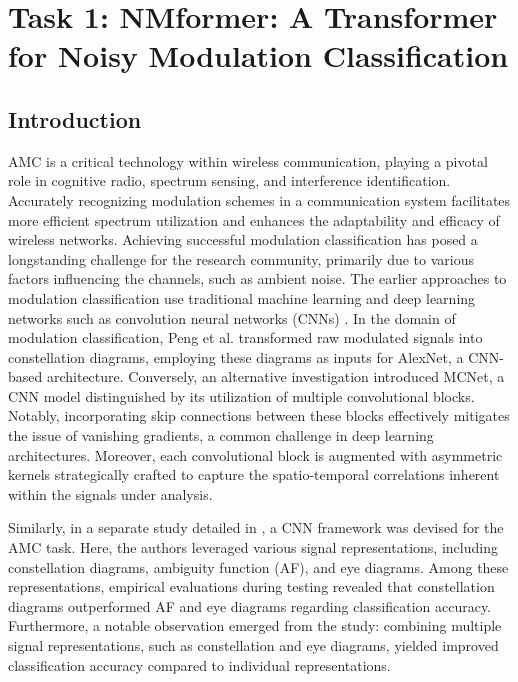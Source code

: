 \section{Task 1: NMformer: A Transformer for Noisy Modulation Classification}

\subsection{Introduction}
AMC is a critical technology within wireless communication, playing a pivotal role in cognitive radio, spectrum sensing, and interference identification. Accurately recognizing modulation schemes in a communication system facilitates more efficient spectrum utilization and enhances the adaptability and efficacy of wireless networks. Achieving successful modulation classification has posed a longstanding challenge for the research community, primarily due to various factors influencing the channels, such as ambient noise. The earlier approaches to modulation classification use traditional machine learning and deep learning networks such as convolution neural networks (CNNs) \cite{peng2017modulation,8963964,10139474}. In the domain of modulation classification, Peng et al. \cite{peng2017modulation} transformed raw modulated signals into constellation diagrams, employing these diagrams as inputs for AlexNet, a CNN-based architecture. Conversely, an alternative investigation \cite{8963964} introduced MCNet, a CNN model distinguished by its utilization of multiple convolutional blocks. Notably, incorporating skip connections between these blocks effectively mitigates the issue of vanishing gradients, a common challenge in deep learning architectures. Moreover, each convolutional block is augmented with asymmetric kernels strategically crafted to capture the spatio-temporal correlations inherent within the signals under analysis.

Similarly, in a separate study detailed in \cite{10139474}, a CNN framework was devised for the AMC task. Here, the authors leveraged various signal representations, including constellation diagrams, ambiguity function (AF), and eye diagrams. Among these representations, empirical evaluations during testing revealed that constellation diagrams outperformed AF and eye diagrams regarding classification accuracy. Furthermore, a notable observation emerged from the study: combining multiple signal representations, such as constellation and eye diagrams, yielded improved classification accuracy compared to individual representations.

